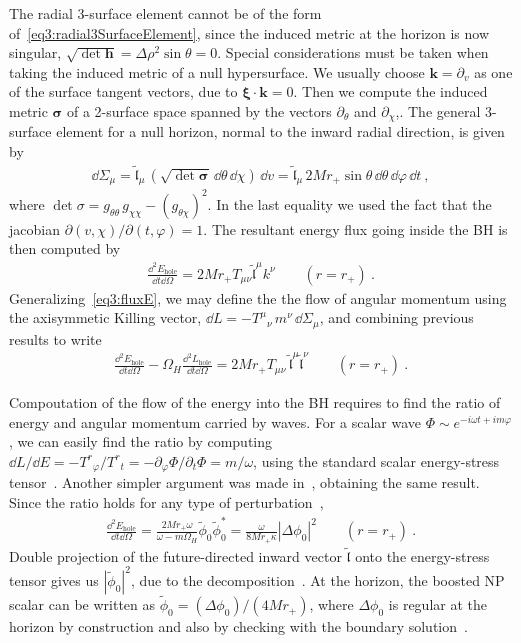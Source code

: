 The radial 3-surface element cannot be of the form of~\eqref{eq3:radial3SurfaceElement}, since the induced metric at the horizon is now singular, $\sqrt{\det{\bm{h}}}=\Delta \rho^2 \sin\theta = 0$.
Special considerations must be taken when taking the induced metric of a null hypersurface.
We usually choose $\bm{k}=\partial_v$ as one of the surface tangent vectors, due to $\bm{\xi}\cdot\bm{k}=0$.
Then we compute the induced metric $\bm{\sigma}$ of a 2-surface space spanned by the vectors $\partial_\theta$ and $\partial_\chi$,.
The general 3-surface element for a null horizon, normal to the inward radial direction, is given by
\begin{align}
    \dd\Sigma_\mu = \tilde{\mathfrak{l}}_\mu \,(\sqrt{\det \bm{\sigma}} \,\dd\theta \,\dd\chi ) \,\dd v = \tilde{\mathfrak{l}}_\mu  \, 2 M r_+ \sin\theta \,\dd\theta \,\dd\varphi \,\dd t ~,
\end{align}
where $\det\sigma = g_{\theta\theta} \,g_{\chi\chi} - (g_{\theta\chi})^2$. In the last equality we used the fact that the jacobian $\partial(v,\chi)/\partial(t,\varphi)=1$.
The resultant energy flux going inside the BH is then computed by
\begin{align}
    \frac{\dd^2 E_\mathrm{hole}}{\dd t \dd\Omega} = 2 M r_{+} T_{\mu\nu} \tilde{\mathfrak{l}}^\mu k^\nu \qquad (r=r_{+})~.
\end{align}
Generalizing~\eqref{eq3:fluxE}, we may define the the flow of angular momentum using the axisymmetic Killing vector, $\dd L = - T^{\mu}{}_\nu \, m^\nu \,\dd\Sigma_\mu$, and combining previous results to write
\begin{align}
    \frac{\dd^2 E_\mathrm{hole}}{\dd t \dd\Omega} - \Omega_H \frac{\dd^2 L_\mathrm{hole}}{\dd t \dd\Omega} = 2 M r_{+} T_{\mu\nu} \,\tilde{\mathfrak{l}}^\mu \tilde{\mathfrak{l}}^\nu \qquad (r=r_{+})~.
\end{align}

Compoutation of the flow of the energy into the BH requires to find the ratio of energy and angular momentum carried by waves.
For a scalar wave $\Phi\sim e^{-i\omega t+ i m\varphi}$, we can easily find the ratio by computing $\dd L/\dd E = -T^r{}_\varphi/T^r{}_t = - \partial_\varphi \Phi / \partial_t \Phi = m/\omega$, using the standard scalar energy-stress tensor~\cite{Bekenstein1973}.
Another simpler argument was made in~, obtaining the same result.
Since the ratio holds for any type of perturbation~\cite{Teukolsky1974},
\begin{align}
    \frac{\dd^2 E_\mathrm{hole}}{\dd t \dd\Omega} = \frac{2 M r_{+} \omega}{\omega - m \Omega_H}  \tilde{\phi}_0 \tilde{\phi}_0^* = \frac{\omega}{8 M r_{+} \kappa} |\Delta \phi_0 |^2 \qquad (r=r_{+})~.
\end{align}
Double projection of the future-directed inward vector $\bm{\tilde{\mathfrak{l}}}$ onto the energy-stress tensor gives us $|\tilde{\phi}_0|^2$, due to the decomposition~.
At the horizon, the boosted NP scalar can be written as $\tilde{\phi}_0 = (\Delta \phi_0)/(4 M r_{+})$, where $\Delta \phi_0$ is regular at the horizon by construction and also by checking with the boundary solution~.

